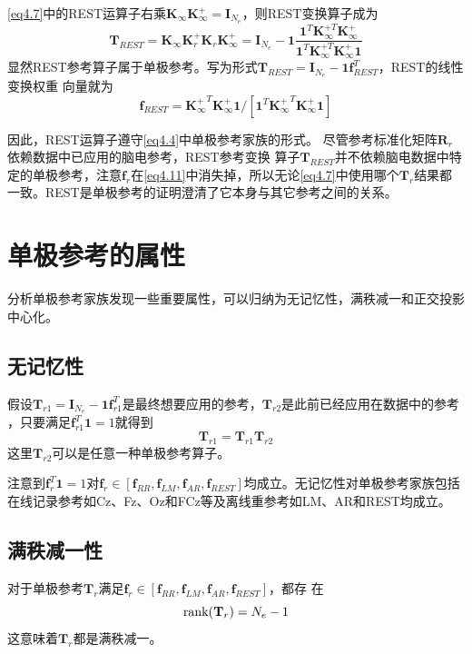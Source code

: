 \eqref{eq4.7}中的REST运算子右乘$\mathbf{K}_{\infty}\mathbf{K}_{\infty}^+=\mathbf{I}_{N_e}$，则REST变换算子成为
\begin{equation}\label{eq4.10}
\mathbf{T}_{REST}=\mathbf{K}_{\infty}\mathbf{K}_{r}^+\mathbf{K}_{r}\mathbf{K}_{\infty}^+=\mathbf{I}_{N_e}-\mathbf{1}\frac{\mathbf{1}^T\mathbf{K}_{\infty}^{+T}\mathbf{K}_{\infty}^+}{\mathbf{1}^T\mathbf{K}_{\infty}^{+T}\mathbf{K}_{\infty}^+\mathbf{1}}
\end{equation}
显然REST参考算子属于单极参考。写为形式$\mathbf{T}_{REST}=\mathbf{I}_{N_e}-\mathbf{1}\mathbf{f}_{REST}^T$，REST的线性变换权重
向量就为
\begin{equation}\label{eq4.11}
\mathbf{f}_{REST}={\mathbf{K}_\infty^+}^T\mathbf{K}_\infty^+\mathbf{1}/{[\mathbf{1}^T{\mathbf{K}_\infty^+}^T\mathbf{K}_\infty^+\mathbf{1}]}
\end{equation}

因此，REST运算子遵守\eqref{eq4.4}中单极参考家族的形式。 尽管参考标准化矩阵$\mathbf{R}_r$依赖数据中已应用的脑电参考，REST参考变换
算子$\mathbf{T}_{REST}$并不依赖脑电数据中特定的单极参考，注意$\mathbf{f}_r$在\eqref{eq4.11}中消失掉，所以无论\eqref{eq4.7}中使用哪个$\mathbf{T}_r$结果都一致。REST是单极参考的证明澄清了它本身与其它参考之间的关系。

\section{单极参考的属性}
分析单极参考家族发现一些重要属性，可以归纳为无记忆性，满秩减一和正交投影中心化。

\subsection{无记忆性}
假设$\mathbf{T}_{r1}=\mathbf{I}_{N_e}-\mathbf{1f}_{r1}^T$是最终想要应用的参考，$\mathbf{T}_{r2}$是此前已经应用在数据中的参考
，只要满足$\mathbf{f}_{r1}^T\mathbf{1}=1$就得到
\begin{equation}\label{eq4.12}
\mathbf{T}_{r1}=\mathbf{T}_{r1}\mathbf{T}_{r2}
\end{equation}
这里$\mathbf{T}_{r2}$可以是任意一种单极参考算子。

注意到$\mathbf{f}_r^T\mathbf{1}=1$对$\mathbf{f}_r\in{[\mathbf{f}_{RR},\mathbf{f}_{LM},\mathbf{f}_{AR},\mathbf{f}_{REST}]}$均成立。无记忆性对单极参考家族包括在线记录参考如Cz、Fz、Oz和FCz等及离线重参考如LM、AR和REST均成立。
\subsection{满秩减一性}
对于单极参考$\mathbf{T}_r$满足$\mathbf{f}_r\in{[\mathbf{f}_{RR},\mathbf{f}_{LM},\mathbf{f}_{AR},\mathbf{f}_{REST}]}$，都存
在
\begin{equation}\label{eq4.13}
\operatorname{rank}(\mathbf{T}_r)=N_e-1
\end{equation}
这意味着$\mathbf{T}_r$都是满秩减一。

